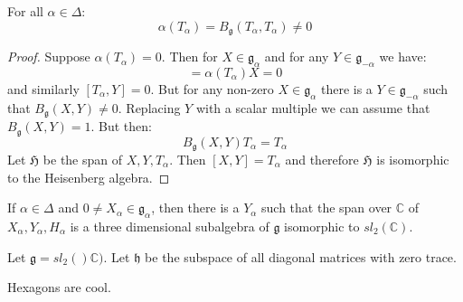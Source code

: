 \documentclass[crop=false,class=article]{standalone}                           %
\begin{document}
        \begin{theorem}
            For all $\alpha\in\Delta$:
            \begin{equation}
                \alpha(T_{\alpha})
                =B_{\mathfrak{g}}(T_{\alpha},T_{\alpha})\ne{0}
            \end{equation}
        \end{theorem}
        \begin{proof}
            Suppose $\alpha(T_{\alpha})=0$. Then for $X\in\mathfrak{g}_{\alpha}$
            and for any $Y\in\mathfrak{g}_{\minus\alpha}$ we have:
            \begin{equation}
                [T_{\alpha},X]=\alpha(T_{\alpha})X=0
            \end{equation}
            and similarly $[T_{\alpha},Y]=0$. But for any non-zero
            $X\in\mathfrak{g}_{\alpha}$ there is a
            $Y\in\mathfrak{g}_{\minus\alpha}$ such that
            $B_{\mathfrak{g}}(X,Y)\ne{0}$. Replacing $Y$ with a scalar multiple
            we can assume that $B_{\mathfrak{g}}(X,Y)=1$. But then:
            \begin{equation}
                B_{\mathfrak{g}}(X,Y)T_{\alpha}=T_{\alpha}
            \end{equation}
            Let $\mathfrak{H}$ be the span of $X,Y,T_{\alpha}$. Then
            $[X,Y]=T_{\alpha}$ and therefore $\mathfrak{H}$ is isomorphic to the
            Heisenberg algebra.
        \end{proof}
        \begin{theorem}
            If $\alpha\in\Delta$ and $0\ne{X}_{\alpha}\in\mathfrak{g}_{\alpha}$,
            then there is a $Y_{\alpha}$ such that the span over $\mathbb{C}$ of
            $X_{\alpha},Y_{\alpha},H_{\alpha}$ is a three dimensional subalgebra
            of $\mathfrak{g}$ isomorphic to $sl_{2}(\mathbb{C})$.
        \end{theorem}
        \begin{example}
            Let $\mathfrak{g}=sl_{2}()\mathbb{C})$. Let $\mathfrak{h}$ be the
            subspace of all diagonal matrices with zero trace.
        \end{example}
        \begin{example}
            Hexagons are cool.
        \end{example}
\end{document}
